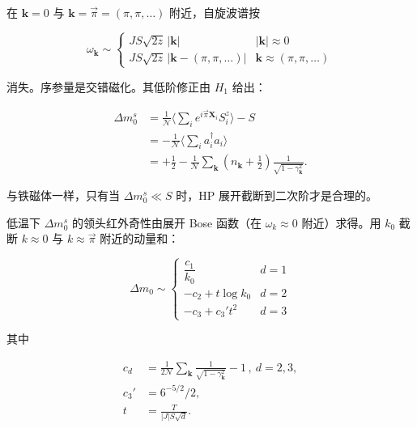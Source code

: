 在 $\mathbf{k} = 0$ 与 $\mathbf{k} = \vec{\pi} = (\pi, \pi, \ldots)$ 附近，自旋波谱按

\begin{equation*}
\omega_ {\mathbf {k}} \sim \left\{ \begin{array}{ll} J S \sqrt {2 z} \, | \mathbf {k} | & | \mathbf {k} | \approx 0 \\ J S \sqrt {2 z} \, | \mathbf {k} - ( \pi, \pi, \ldots ) | & \mathbf {k} \approx ( \pi, \pi, \ldots ) \end{array} \right.
\tag{11.67}
\end{equation*}

消失。序参量是交错磁化。其低阶修正由 $H_{1}$ 给出：

\begin{align*}
\Delta m _ {0} ^ {s} & = \frac {1}{\mathcal {N}} \Big\langle \sum_ {i} e ^ {i \vec {\pi} \mathbf {X} _ {i}} S _ {i} ^ {z} \Big\rangle - S\\
& = - \frac {1}{\mathcal {N}} \Big\langle \sum_ {i} a _ {i} ^ {\dagger} a _ {i} \Big\rangle\\
& = + \frac {1}{2} - \frac {1}{\mathcal {N}} \sum_ {\mathbf {k}} \left( n _ {\mathbf {k}} + \frac {1}{2} \right) \frac {1}{\sqrt {1 - \gamma_{\mathbf {k}} ^ {2}}} .
\tag{11.68}
\end{align*}

与铁磁体一样，只有当 $\Delta m_{0}^{s} \ll S$ 时，HP 展开截断到二次阶才是合理的。

低温下 $\Delta m_{0}^{s}$ 的领头红外奇性由展开 Bose 函数（在 $\omega_{k} \approx 0$ 附近）求得。用 $k_{0}$ 截断 $k \approx 0$ 与 $k \approx \vec{\pi}$ 附近的动量和：

\begin{equation*}
\Delta m _ {0} \sim \left\{ \begin{array}{ll} \dfrac {c _ {1}}{k _ {0}} & d = 1 \\[4pt] - c _ {2} + t \log k _ {0} & d = 2 \\[4pt] - c _ {3} + c _ {3} ' t ^ {2} & d = 3 \end{array} \right.
\tag{11.69}
\end{equation*}

其中

\begin{align*}
c _ {d} & = \frac {1}{2 \mathcal {N}} \sum_ {\mathbf {k}} \frac {1}{\sqrt {1 - \gamma_{\mathbf {k}} ^ {2}}} - 1 \, , \ d = 2, 3 ,\\
c _ {3} ' & = 6 ^ {- 5/2} / 2 ,\\
t & = \frac {T}{| J | S \sqrt {d}} .
\tag{11.70}
\end{align*}

